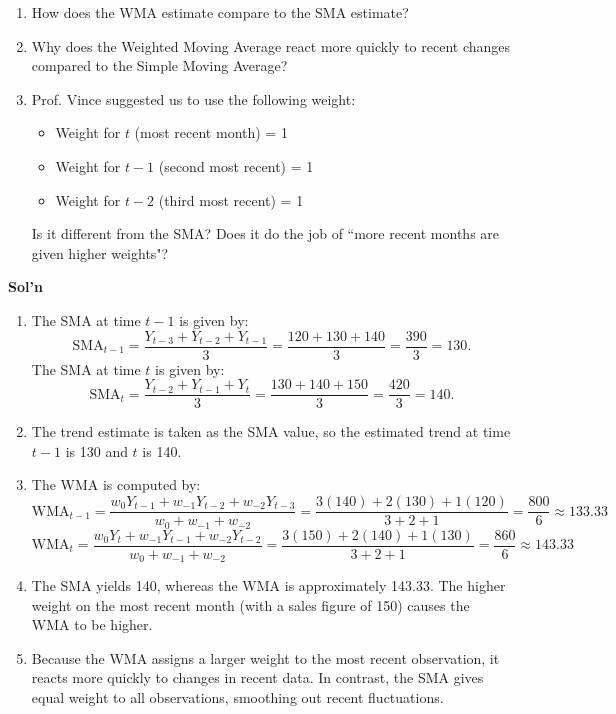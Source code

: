 \documentclass[addpoints,12pt,answers]{exam}
\begin{document}
\begin{questions}
\begin{enumerate}[label=(\alph*)]
			\item How does the WMA estimate compare to the SMA estimate?
			\item Why does the Weighted Moving Average react more quickly to recent changes compared to the Simple Moving Average?
			\item Prof. Vince suggested us to use the following weight:
			\begin{itemize}
				\item Weight for \( t \) (most recent month) = 1
				\item Weight for \( t-1 \) (second most recent) = 1
				\item Weight for \( t-2 \) (third most recent) = 1
			\end{itemize}
			Is it different from the SMA? Does it do the job of ``more recent months are given higher weights"?
		\end{enumerate}
		
		\clearpage
		\textbf{Sol'n}
		\begin{enumerate}[label=(\alph*)]
			\item 
			The SMA at time \(t-1\) is given by:
			\[
			\text{SMA}_{t-1} = \frac{Y_{t-3} + Y_{t-2} + Y_{t-1}}{3} = \frac{120 + 130 + 140}{3} = \frac{390}{3} = 130.
			\]
			The SMA at time \(t\) is given by:
			\[
			\text{SMA}_t = \frac{Y_{t-2} + Y_{t-1} + Y_t}{3} = \frac{130 + 140 + 150}{3} = \frac{420}{3} = 140.
			\]
			
			\item 
			The trend estimate is taken as the SMA value, so the estimated trend at time $t-1$ is 130 and \(t\) is 140.

			\item 
			The WMA is computed by:
			\[
			\text{WMA}_{t-1} = \frac{w_0 Y_{t-1} + w_{-1} Y_{t-2} + w_{-2} Y_{t-3}}{w_0 + w_{-1} + w_{-2}}
			= \frac{3(140) + 2(130) + 1(120)}{3 + 2 + 1} = \frac{800}{6} \approx 133.33
			\]
			\[
			\text{WMA}_t = \frac{w_0 Y_t + w_{-1} Y_{t-1} + w_{-2} Y_{t-2}}{w_0 + w_{-1} + w_{-2}}
			= \frac{3(150) + 2(140) + 1(130)}{3 + 2 + 1} = \frac{860}{6} \approx 143.33
			\]
			
			\item 
			The SMA yields 140, whereas the WMA is approximately 143.33. The higher weight on the most recent month (with a sales figure of 150) causes the WMA to be higher.
			
			\item 
			Because the WMA assigns a larger weight to the most recent observation, it reacts more quickly to changes in recent data. In contrast, the SMA gives equal weight to all observations, smoothing out recent fluctuations.
			

\end{enumerate}
\end{questions}
\end{document}
